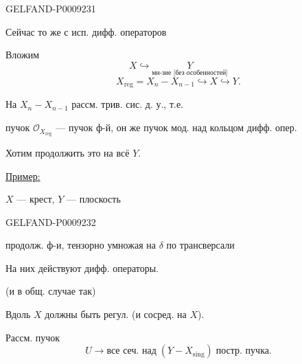 \begin{GelfandAdjacentEvidence}{GELFAND-P000923}{1}

Сейчас то же с исп. дифф. операторов

Вложим
\[
 X\hookrightarrow\underset{\text{мн-зие [без особенностей]}}{Y}
\]
\begin{equation*}
 X_{\mathrm{reg}}=X_n-X_{n-1}\hookrightarrow X\hookrightarrow Y.
 \tag{4}
\end{equation*}

На $X_n-X_{n-1}$ рассм. трив. сис. д. у., т.е.

пучок $\mathcal O_{X_{\mathrm{reg}}}$ --- пучок ф-й, он же пучок мод. над кольцом дифф. опер.

Хотим продолжить это на всё $Y$.

\underline{Пример:}

$X$ --- крест, \qquad $Y$ --- плоскость
\end{GelfandAdjacentEvidence}
\begin{GelfandAdjacentEvidence}{GELFAND-P000923}{2}


продолж. ф-и, тензорно умножая на $\delta$ по трансверсали

На них действуют дифф. операторы.

(и в общ. случае так)

Вдоль $X$ должны быть регул. (и сосред. на $X$).

Рассм. пучок
\begin{equation*}
 U\longrightarrow\text{все сеч. над}\;(Y-X_{\mathrm{sing}})\;\text{постр. пучка}.
\end{equation*}
\end{GelfandAdjacentEvidence}
